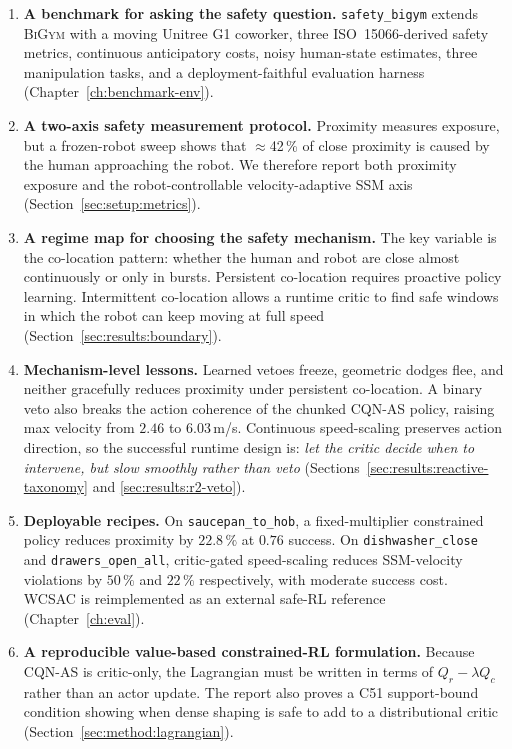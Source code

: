 \documentclass[11pt,a4paper]{report}
\newcommand{\ssm}{SSM}
\newcommand{\iso}{ISO~15066}
\newcommand{\bigym}{\textsc{BiGym}}
\newcommand{\sbigym}{\texttt{safety\_bigym}}
\begin{document}
\begin{enumerate}[label=\textbf{C\arabic*.}, leftmargin=2em]
\item \textbf{A benchmark for asking the safety question.}
  \sbigym{} extends \bigym{} with a moving Unitree G1 coworker, three
  \iso{}-derived safety metrics, continuous anticipatory costs, noisy
  human-state estimates, three manipulation tasks, and a
  deployment-faithful evaluation harness (Chapter~\ref{ch:benchmark-env}).
\item \textbf{A two-axis safety measurement protocol.} Proximity
  measures exposure, but a frozen-robot sweep shows that
  $\approx$42\,\% of close proximity is caused by the human approaching
  the robot. We therefore report both proximity exposure and the
  robot-controllable velocity-adaptive \ssm{} axis
  (Section~\ref{sec:setup:metrics}).
\item \textbf{A regime map for choosing the safety mechanism.} The
  key variable is the co-location pattern: whether the human and robot
  are close almost continuously or only in bursts. Persistent
  co-location requires proactive policy learning. Intermittent
  co-location allows a runtime critic to find safe windows in which the
  robot can keep moving at full speed
  (Section~\ref{sec:results:boundary}).
\item \textbf{Mechanism-level lessons.} Learned vetoes freeze, geometric
  dodges flee, and neither gracefully reduces proximity under persistent
  co-location. A binary veto also breaks the action coherence of the
  chunked CQN-AS policy, raising max velocity from $2.46$ to
  $6.03$\,m/s. Continuous speed-scaling preserves action direction, so
  the successful runtime design is: \emph{let the critic decide when to
  intervene, but slow smoothly rather than veto}
  (Sections~\ref{sec:results:reactive-taxonomy} and
  \ref{sec:results:r2-veto}).
\item \textbf{Deployable recipes.} On \texttt{saucepan\_to\_hob}, a
  fixed-multiplier constrained policy reduces proximity by $22.8\,\%$
  at $0.76$ success. On \texttt{dishwasher\_close} and
  \texttt{drawers\_open\_all}, critic-gated speed-scaling reduces
  \ssm{}-velocity violations by $50\,\%$ and $22\,\%$ respectively,
  with moderate success cost. WCSAC is reimplemented as an external
  safe-RL reference (Chapter~\ref{ch:eval}).
\item \textbf{A reproducible value-based constrained-RL formulation.}
  Because CQN-AS is critic-only, the Lagrangian must be written in
  terms of $Q_r-\lambda Q_c$ rather than an actor update. The report
  also proves a C51 support-bound condition showing when dense shaping
  is safe to add to a distributional critic
  (Section~\ref{sec:method:lagrangian}).
\end{enumerate}
\end{document}
